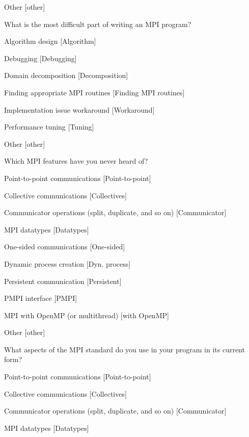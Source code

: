 \documentclass[preprint,5p,times]{elsarticle}
\begin{document}
{\begin{description}
\begin{inparaenum}[{\bf C}1)]
    \item Other [other]
    \end{inparaenum}
  \item[Q15:] What is the most difficult part of writing an MPI program?
    \begin{inparaenum}[{\bf C}1)]
    \item Algorithm design [Algorithm]
    \item Debugging [Debugging]
    \item Domain decomposition [Decomposition]
    \item Finding appropriate MPI routines [Finding MPI routines]
    \item Implementation issue workaround [Workaround]
    \item Performance tuning [Tuning]
    \item Other [other]
    \end{inparaenum}
  \item[Q16*:] Which MPI features have you never heard of?
    \begin{inparaenum}[{\bf C}1)]
    \item Point-to-point communications [Point-to-point]
    \item Collective communications [Collectives]
    \item Communicator operations (split, duplicate, and so on) [Communicator]
    \item MPI datatypes [Datatypes]
    \item One-sided communications [One-sided]
    \item Dynamic process creation [Dyn. process]
    \item Persistent communication [Persistent]
    \item PMPI interface [PMPI]
    \item MPI with OpenMP (or multithread) [with OpenMP]
    \item Other [other]
    \end{inparaenum}
  \item[Q17*:] What aspects of the MPI standard do you use in your program in its current form?
    \begin{inparaenum}[{\bf C}1)]
    \item Point-to-point communications [Point-to-point]
    \item Collective communications [Collectives]
    \item Communicator operations (split, duplicate, and so on) [Communicator]
    \item MPI datatypes [Datatypes]

\end{inparaenum}
\end{description}}
\end{document}
